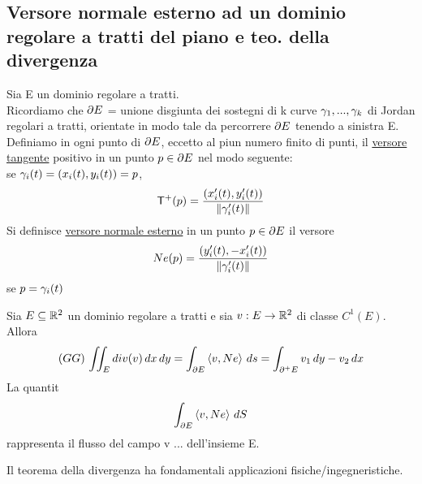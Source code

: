 \subsection{Versore normale esterno ad un dominio regolare a tratti del piano e 
teo. della divergenza}
Sia E un dominio regolare a tratti. \\
Ricordiamo che 
$\partial E$ = unione disgiunta dei sostegni di k curve $\gamma_1,...,\gamma_k$ di Jordan regolari 
a tratti, orientate in modo tale da percorrere $\partial E$ tenendo a sinistra E.\\
Definiamo in ogni punto di $\partial E$, eccetto al pi\acu un numero finito di punti, il 
\underline{versore tangente} positivo in un punto $p\in\partial E$ nel modo seguente:\\
se $\gamma_i(t) = (x_i(t),y_i(t)) = p$, 
$$\mathsf{T}^+(p)=\frac{(x_i'(t), y_i'(t))}{\left\lVert\gamma_i'(t)\right\rVert}$$
Si definisce \underline{versore normale esterno} in un punto $p\in\partial E$ il versore
$$Ne(p) = \frac{(y_i'(t), -x_i'(t))}{\left\lVert\gamma_i'(t)\right\rVert}$$
se $p=\gamma_i(t)$
\begin{theorem}
  Sia $E\subseteq\mathbb{R}^2$ un dominio regolare a tratti e sia $v:E\to\mathbb{R}^2$ 
  di classe $C^1(E)$. Allora
  $$(GG)\, \iint_{E}div(v)\,dx\,dy = \int_{\partial E}\left\langle v,Ne \right\rangle\,ds = \int_{\partial^+ E} v_1\,dy-v_2\,dx$$
  La quantit\aca $$\int_{\partial E}\left\langle v,Ne \right\rangle\,dS$$
  rappresenta il flusso del campo v ... dell'insieme E.
\end{theorem}
Il teorema della divergenza ha fondamentali applicazioni fisiche/ingegneristiche.

